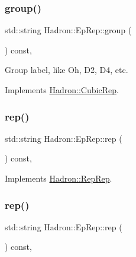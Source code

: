\subsubsection{\texorpdfstring{group()}{group()}\hspace{0.1cm}{\footnotesize\ttfamily [3/3]}}
{\footnotesize\ttfamily std\+::string Hadron\+::\+Ep\+Rep\+::group (\begin{DoxyParamCaption}{ }\end{DoxyParamCaption}) const\hspace{0.3cm}{\ttfamily [inline]}, {\ttfamily [virtual]}}

Group label, like Oh, D2, D4, etc. 

Implements \mbox{\hyperlink{structHadron_1_1CubicRep_a0748f11ec87f387062c8e8981339a29c}{Hadron\+::\+Cubic\+Rep}}.

\mbox{\label{structHadron_1_1EpRep_aa5a9f64d0578ca4e2ba9abce86d06bd6}} 
\subsubsection{\texorpdfstring{rep()}{rep()}\hspace{0.1cm}{\footnotesize\ttfamily [1/5]}}
{\footnotesize\ttfamily std\+::string Hadron\+::\+Ep\+Rep\+::rep (\begin{DoxyParamCaption}{ }\end{DoxyParamCaption}) const\hspace{0.3cm}{\ttfamily [inline]}, {\ttfamily [virtual]}}



Implements \mbox{\hyperlink{structHadron_1_1RepRep_ab3213025f6de249f7095892109575fde}{Hadron\+::\+Rep\+Rep}}.

\mbox{\label{structHadron_1_1EpRep_aa5a9f64d0578ca4e2ba9abce86d06bd6}} 
\subsubsection{\texorpdfstring{rep()}{rep()}\hspace{0.1cm}{\footnotesize\ttfamily [2/5]}}
{\footnotesize\ttfamily std\+::string Hadron\+::\+Ep\+Rep\+::rep (\begin{DoxyParamCaption}{ }\end{DoxyParamCaption}) const\hspace{0.3cm}{\ttfamily [inline]}, {\ttfamily [virtual]}}



